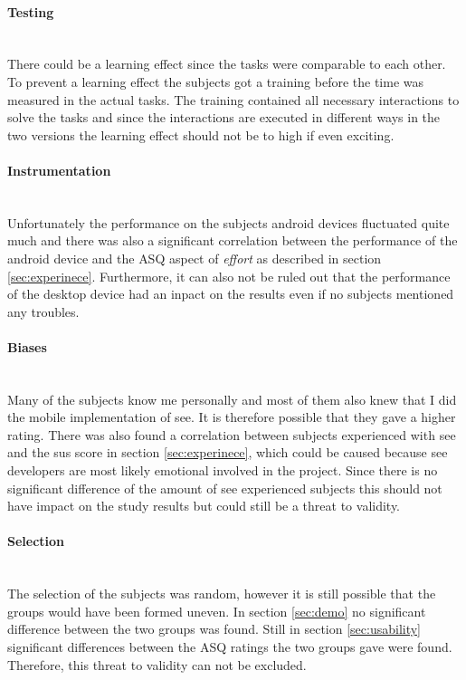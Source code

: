 \paragraph{Testing}\mbox{}\\
There could be a learning effect since the tasks were comparable to each other. 
To prevent a learning effect the subjects got a training before the time was measured in the actual tasks.
The training contained all necessary interactions to solve the tasks and since the interactions are executed in different ways in the two versions the learning effect should not be to high if even exciting.

\paragraph{Instrumentation}\mbox{}\\
Unfortunately the performance on the subjects \gls{android} devices fluctuated quite much and there was also a significant correlation between the performance of the \gls{android} device and the \gls{ASQ} aspect of \textit{effort} as described in section \ref{sec:experinece}.
Furthermore, it can also not be ruled out that the performance of the desktop device had an inpact on the results even if no subjects mentioned any troubles.
\paragraph{Biases}\mbox{}\\
Many of the subjects know me personally and most of them also knew that I did the mobile implementation of \gls{see}. 
It is therefore possible that they gave a higher rating. 
There was also found a correlation between subjects experienced with \gls{see} and the \gls{sus} score in section \ref{sec:experinece}, which could be caused because \gls{see} developers are most likely emotional involved in the project.
Since there is no significant difference of the amount of \gls{see} experienced subjects this should not have impact on the study results but could still be a threat to validity.
\paragraph{Selection}\mbox{}\\
The selection of the subjects was random, however it is still possible that the groups would have been formed uneven.
In section \ref{sec:demo} no significant difference between the two groups was found.
Still in section \ref{sec:usability} significant differences between the \gls{ASQ} ratings the two groups gave were found.
Therefore, this threat to validity can not be excluded. 
